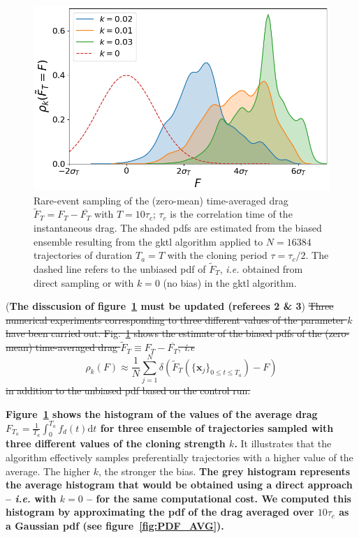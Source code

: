 \documentclass{jfm}
\begin{document}
\begin{figure}
  \centering
  \includegraphics[width=0.7\linewidth]{IS_GKTL/IS_GKTL}
  \caption{\label{fig:IS_GKTL} Rare-event sampling of the (zero-mean) time-averaged drag $\tilde F_T = F_T - \overline{F_T}$ with $T=10\tau_c$; $\tau_c$ is the correlation time of the instantaneous drag. The shaded \ac{pdf}s are estimated from the biased ensemble resulting from the \ac{gktl} algorithm applied to $N=16384$ trajectories of duration $T_a=T$ with the cloning period $\tau=\tau_c/2$.
    The dashed line refers to the unbiased \ac{pdf} of $\tilde F_T$, \textit{i.e.} obtained from direct sampling or with $k=0$ (no bias) in the \ac{gktl} algorithm.
  }
\end{figure}
%

(\textbf{The disscusion of figure~\ref{fig:IS_GKTL} must be updated (referees 2 \& 3})
\sout{Three numerical experiments corresponding to three different values of the parameter $k$ have been carried out.
%
Fig.~\ref{fig:IS_GKTL} shows the estimate of the biased \ac{pdf}s of the (zero-mean) time-averaged drag $\tilde F_T \equiv F_T - \overline{F_T}$, \emph{i.e}}
\begin{equation}
\label{eq:estimate_biased_measure}
\rho_k(F) 
\approx \frac{1}{N}\sum_{j=1}^{N}\delta(\tilde F_{T}(\{\mathbf{x}_j\}_{0\leq t \leq T_a}) - F)
\end{equation}
\sout{
in addition to the unbiased \ac{pdf} based on the control run.}

\textbf{Figure~\ref{fig:IS_GKTL} shows the histogram of the values of the average drag $F_{T_a} = \frac{1}{T_a}\int_{0}^{T_a}f_d(t)\mathrm{d}t$ for three ensemble of trajectories sampled with three different values of the cloning strength $k$.}
It illustrates that the algorithm effectively samples preferentially trajectories with a higher value of the average.
The higher $k$, the stronger the bias.
\textbf{The grey histogram represents the average histogram that would be obtained using a direct approach -- \textit{i.e.} with $k=0$ -- for the same computational cost.
We computed this histogram by approximating the \ac{pdf} of the drag averaged over $10\tau_c$ as a Gaussian \ac{pdf} (see figure~\ref{fig:PDF_AVG}).}
\end{document}
